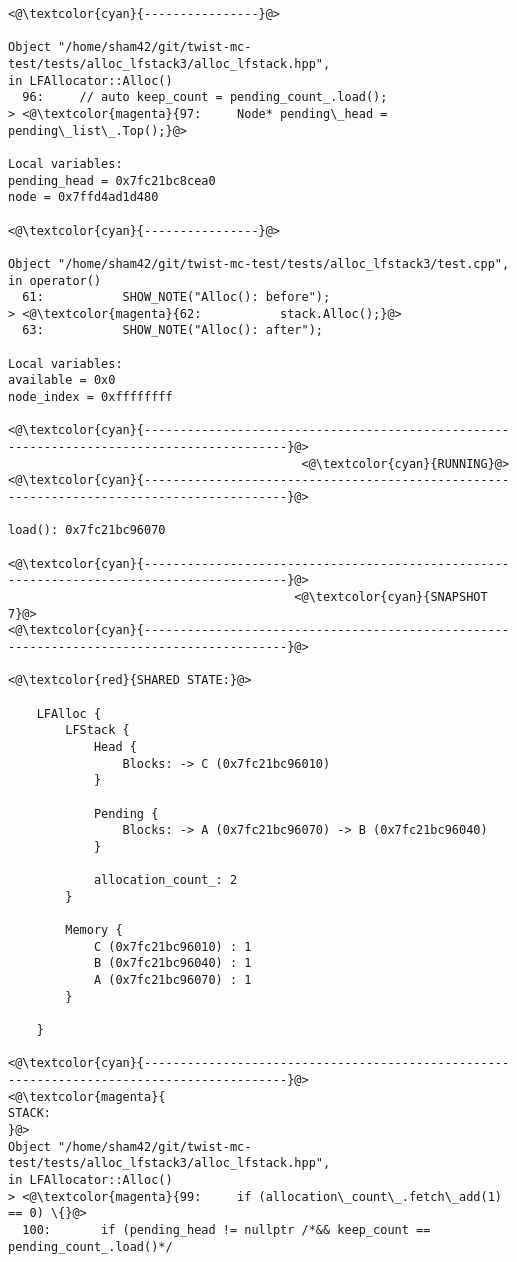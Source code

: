 \begin{adjustwidth}{-3.3cm}{-1cm}
\begin{allintypewriter}
\begin{multicols*}{2}
\begin{lstlisting}[numbers=none]
<@\textcolor{cyan}{----------------}@>

Object "/home/sham42/git/twist-mc-test/tests/alloc_lfstack3/alloc_lfstack.hpp",
in LFAllocator::Alloc()
  96:     // auto keep_count = pending_count_.load();
> <@\textcolor{magenta}{97:     Node* pending\_head = pending\_list\_.Top();}@>

Local variables: 
pending_head = 0x7fc21bc8cea0
node = 0x7ffd4ad1d480

<@\textcolor{cyan}{----------------}@>

Object "/home/sham42/git/twist-mc-test/tests/alloc_lfstack3/test.cpp",
in operator()
  61:           SHOW_NOTE("Alloc(): before");
> <@\textcolor{magenta}{62:           stack.Alloc();}@>
  63:           SHOW_NOTE("Alloc(): after");

Local variables: 
available = 0x0
node_index = 0xffffffff

<@\textcolor{cyan}{------------------------------------------------------------------------------------------}@>
                                         <@\textcolor{cyan}{RUNNING}@>
<@\textcolor{cyan}{------------------------------------------------------------------------------------------}@>

load(): 0x7fc21bc96070

<@\textcolor{cyan}{------------------------------------------------------------------------------------------}@>
                                        <@\textcolor{cyan}{SNAPSHOT 7}@>
<@\textcolor{cyan}{------------------------------------------------------------------------------------------}@>

<@\textcolor{red}{SHARED STATE:}@>

    LFAlloc {
	    LFStack {
		    Head {
			    Blocks: -> C (0x7fc21bc96010) 
		    }

		    Pending {
			    Blocks: -> A (0x7fc21bc96070) -> B (0x7fc21bc96040) 
		    }

		    allocation_count_: 2
	    }

	    Memory {
		    C (0x7fc21bc96010) : 1
		    B (0x7fc21bc96040) : 1
		    A (0x7fc21bc96070) : 1
	    }

    }

<@\textcolor{cyan}{------------------------------------------------------------------------------------------}@>
<@\textcolor{magenta}{
STACK:
}@>
Object "/home/sham42/git/twist-mc-test/tests/alloc_lfstack3/alloc_lfstack.hpp",
in LFAllocator::Alloc()
> <@\textcolor{magenta}{99:     if (allocation\_count\_.fetch\_add(1) == 0) \{}@>
  100:       if (pending_head != nullptr /*&& keep_count == pending_count_.load()*/


\end{lstlisting}
\end{multicols*}
\end{allintypewriter}
\end{adjustwidth}
